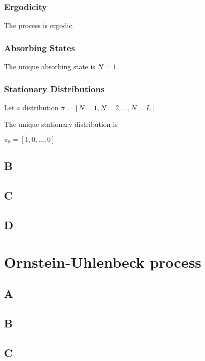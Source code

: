 \documentclass{article}
\begin{document}
\subsubsection{Ergodicity}

The process is ergodic.

\subsubsection{Absorbing States}

The unique absorbing state is $N = 1$.

\subsubsection{Stationary Distributions}

Let a distribution $\pi = [N=1, N=2,... ,N=L]$

The unique stationary distribution is 

$\pi_0 = [1,0,...,0]$






\subsection{B}

\subsection{C}

\subsection{D}

\section{Ornstein-Uhlenbeck process}

\subsection{A}

\subsection{B}

\subsection{C}
\end{document}
